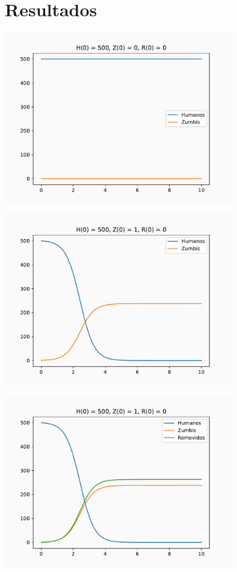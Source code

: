 \documentclass[xcolor=dvipsnames, aspectratio=169]{beamer}
\begin{document}
    \section{Resultados}
    \begin{frame}
        \begin{center}
            \includegraphics[width=0.75\textwidth]{1.pdf}
        \end{center}
    \end{frame}
    \begin{frame}
        \begin{center}
            \includegraphics[width=0.75\textwidth]{2.pdf}
        \end{center}
    \end{frame}
    \begin{frame}
        \begin{center}
            \includegraphics[width=0.75\textwidth]{3.pdf}
        \end{center}
    \end{frame}
\end{document}
